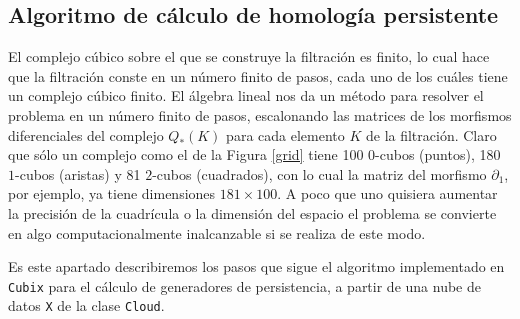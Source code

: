 \documentclass[12pt,a4paper,twoside]{article} %
\theoremstyle{plain}
\theoremstyle{definition}
\begin{document}
\subsection{Algoritmo de cálculo de homología persistente}

El complejo cúbico sobre el que se construye la filtración es finito, lo cual hace que la filtración conste en un número finito de pasos, cada uno de los cuáles tiene un complejo cúbico finito. El álgebra lineal nos da un método para resolver el problema en un número finito de pasos, escalonando las matrices de los morfismos diferenciales del complejo $Q_*(K)$ para cada elemento $K$ de la filtración. Claro que sólo un complejo como el de la Figura \ref{grid} tiene 100 $0$-cubos (puntos), 180 $1$-cubos (aristas) y 81 $2$-cubos (cuadrados), con lo cual la matriz del morfismo $\partial_1$, por ejemplo, ya tiene dimensiones $181 \times 100$. A poco que uno quisiera aumentar la precisión de la cuadrícula o la dimensión del espacio el problema se convierte en algo computacionalmente inalcanzable si se realiza de este modo.

Es este apartado describiremos los pasos que sigue el algoritmo implementado en \texttt{Cubix} para el cálculo de generadores de persistencia, a partir de una nube de datos \texttt{X} de la clase \texttt{Cloud}.
\end{document}
